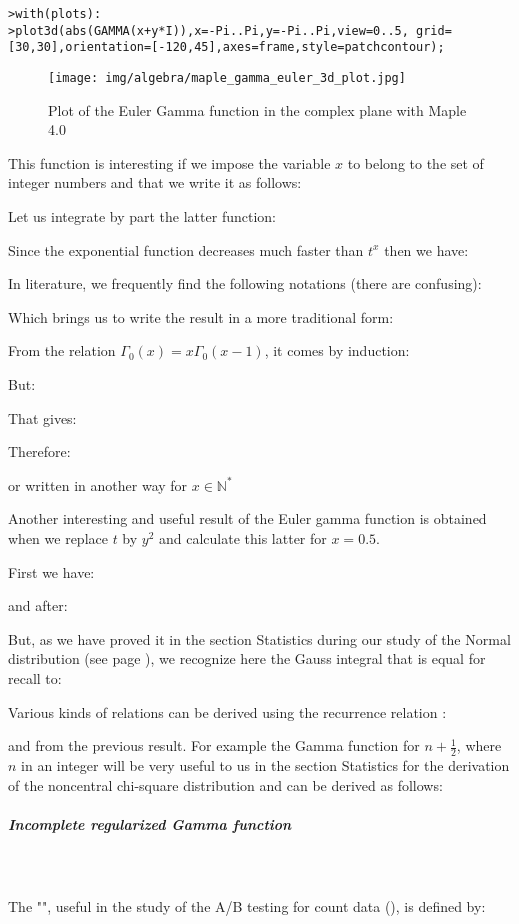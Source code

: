 	\texttt{>with(plots):\\}
	\texttt{>plot3d(abs(GAMMA(x+y*I)),x=-Pi..Pi,y=-Pi..Pi,view=0..5, grid=[30,30],orientation=[-120,45],axes=frame,style=patchcontour);}
	
	\begin{figure}[H]
		\centering
		\texttt{[image: img/algebra/maple\_gamma\_euler\_3d\_plot.jpg]}
		\caption{Plot of the Euler Gamma function in the complex plane with Maple 4.0}
	\end{figure}
	This function is interesting if we impose the variable $x$ to belong to the set of integer numbers and that we write it as follows:
	
	Let us integrate by part the latter function:
	
	Since the exponential function decreases much faster than $t^x$ then we have:
	
	In literature, we frequently find the following notations (there are confusing):
	
	Which brings us to write the result in a more traditional form:
	
	From the relation $\Gamma_{0}(x)=x\Gamma_{0}(x-1)$, it comes by induction:
	
	But:
	
	That gives:
	
	Therefore:
	
	or written in another way for $x\in \mathbb{N}^*$
	
	Another interesting and useful result of the Euler gamma function is obtained when we replace $t$ by $y^2$ and calculate this latter for $x=0.5$.
	
	First we have:
	
	and after:
	
	But, as we have proved it in the section Statistics during our study of the Normal distribution (see page \pageref{Gauss integral}), we recognize here the Gauss integral that is equal for recall to:
	
	Various kinds of relations can be derived using the recurrence relation :
	
	and from the previous result. For example the Gamma function for $n+\frac{1}{2}$, where $n$ in an integer will be very useful to us in the section Statistics for the derivation of the noncentral chi-square distribution and can be derived as follows:
	
	
	\subparagraph{Incomplete regularized Gamma function}\label{incomplete regularized Gamma function}\mbox{}\\\\
	The "", useful in the study of the A/B testing for count data (), is defined by:
	

